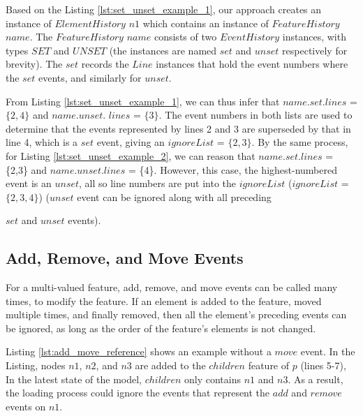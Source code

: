 Based on the Listing \ref{lst:set_unset_example_1}, our approach creates an instance of $ElementHistory$ $n1$ which contains an instance of $FeatureHistory$ $name$. The $FeatureHistory$ $name$ consists of two $EventHistory$ instances, with types $SET$ and $UNSET$ (the instances are named $set$ and $unset$ respectively for brevity). The $set$ records the $Line$ instances that hold the event numbers where the $set$ events, and similarly for $unset$.

From Listing \ref{lst:set_unset_example_1}, we can thus infer that $name$.$set$.$lines$ = $\{2,4\}$ and $name$.$unset$. $lines$ = $\{3\}$. The event numbers in both lists are used to determine that the events represented by lines 2 and 3 are superseded by that in line 4, which is a $set$ event, giving an $ignoreList$ = $\{2, 3\}$.  By the same process, for Listing \ref{lst:set_unset_example_2}, we can reason that $name$.$set$.$lines$ = \{2,3\} and $name$.$unset$.$lines$ = \{4\}.  However, this case, the highest-numbered event is an $unset$, all so line numbers are put into the $ignoreList$ ($ignoreList$ = $\{2, 3, 4\}$) ($unset$ event can be ignored along with all preceding {$set$ and $unset$ events). 

\subsection{Add, Remove, and Move Events}\label{subsec:add_remove_and_move_operations}
For a multi-valued feature, add, remove, and move events can be called many times, to modify the feature. If an element is added to the feature, moved multiple times, and finally removed, then all the element's preceding events can be ignored, as long as the order of the feature's elements is not changed. 



Listing \ref{lst:add_move_reference} shows an example without a $move$ event. In the Listing, nodes $n1$, $n2$, and $n3$ are added to the $children$ feature of $p$ (lines 5-7), In the latest state of the model, $children$ only contains $n1$ and $n3$. As a result, the loading process could ignore the events that represent the \textit{$add$} and \textit{$remove$} events on $n1$. 

}
